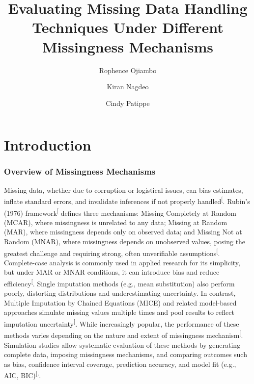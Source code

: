 \documentclass[
  letterpaper,
  DIV=11,
  numbers=noendperiod]{scrartcl}
\title{Evaluating Missing Data Handling Techniques Under Different
Missingness Mechanisms}
\author{Rophence Ojiambo \and Kiran Nagdeo \and Cindy Patippe}
\date{}
\begin{document}
\maketitle


\section{Introduction}\label{introduction}

\subsubsection{Overview of Missingness
Mechanisms}\label{overview-of-missingness-mechanisms}

Missing data, whether due to corruption or logistical issues, can bias
estimates, inflate standard errors, and invalidate inferences if not
properly
handled\textsuperscript{{[}\citeproc{ref-rubin1987statistical}{1}{]}}.
Rubin's (1976)
framework\textsuperscript{{[}\citeproc{ref-rubin1976inference}{2}{]}}
defines three mechanisms: Missing Completely at Random (MCAR), where
missingness is unrelated to any data; Missing at Random (MAR), where
missingness depends only on observed data; and Missing Not at Random
(MNAR), where missingness depends on unobserved values, posing the
greatest challenge and requiring strong, often unverifiable
assumptions\textsuperscript{{[}\citeproc{ref-enders2022applied}{3}{]}}.
Complete-case analysis is commonly used in applied research for its
simplicity, but under MAR or MNAR conditions, it can introduce bias and
reduce
efficiency\textsuperscript{{[}\citeproc{ref-schafer2002missing}{4}{]}}.
Single imputation methods (e.g., mean substitution) also perform poorly,
distorting distributions and underestimating uncertainty. In contrast,
Multiple Imputation by Chained Equations (MICE) and related model-based
approaches simulate missing values multiple times and pool results to
reflect imputation
uncertainty\textsuperscript{{[}\citeproc{ref-van2011mice}{5}{]}}. While
increasingly popular, the performance of these methods varies depending
on the nature and extent of missingness
mechanism\textsuperscript{{[}\citeproc{ref-donders2006gentle}{6}{]}}.
Simulation studies allow systematic evaluation of these methods by
generating complete data, imposing missingness mechanisms, and comparing
outcomes such as bias, confidence interval coverage, prediction
accuracy, and model fit (e.g., AIC,
BIC)\textsuperscript{{[},\citeproc{ref-carpenter2023multiple}{8}{]}}.
\end{document}

